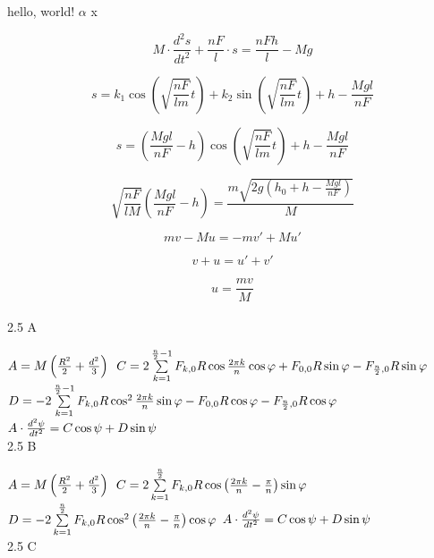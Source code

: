 \documentclass{article}
\begin{document}
hello, world!
$\alpha$
x

\begin{equation}
M\cdot\frac{d^{2}s}{dt^{2}}+\frac{nF}{l}\cdot s = \frac{nFh}{l}-Mg
\label{2}
\end{equation}

\begin{equation}
s=k_1\cos\left (  \sqrt{ \frac{nF}{lm}} t\right ) +k_2\sin\left ( \sqrt{\frac{nF}{lm}} t\right ) +h-\frac{Mgl}{nF}  
\end{equation}


\begin{equation}
s=\left ( \frac{Mgl}{nF}-h \right )\cos\left (  \sqrt{ \frac{nF}{lm}} t\right ) +h-\frac{Mgl}{nF}  
\end{equation}


\begin{equation}
\sqrt{\frac{nF}{lM}}\left ( \frac{Mgl}{nF}-h \right )=\frac{m\sqrt{2g\left ( h_0+h-\frac{Mgl}{nF} \right )}}{M}
\end{equation}

\begin{equation}
mv-Mu=-m{v}'+M{u}'
\end{equation}

\begin{equation}
v+u={u}'+{v}'
\end{equation}

\begin{equation}
u=\frac{mv}{M}
\end{equation}	
\\
2.5 A

$A=M\left ( \frac{R^2}{2}+\frac{d^2}{3} \right ) \\$
$C=2\sum\limits_{k=1}^{\frac{n}{2}-1}F_{k,0}R\cos\frac{2\pi k}{n}\cos\varphi 
	+ F_{0,0} R\sin\varphi
	- F_{\frac{n}{2},0} R\sin\varphi
 \\ $
$D=-2\sum\limits_{k=1}^{\frac{n}{2}-1}F_{k,0} R\cos^2\frac{2\pi k}{n}\sin\varphi
	-F_{0,0} R\cos\varphi
	-F_{\frac{n}{2},0} R\cos\varphi 
\\$
$A\cdot \frac{d^{2}\psi }{dt^{2} }=C\cos\psi+D\sin \psi
\\$
\\
2.5 B

$A=M\left ( \frac{R^2}{2}+\frac{d^2}{3} \right ) \\ $
$C= 2\sum\limits_{k=1}^{\frac{n}{2}}F_{k,0}R\cos\left ( \frac{2\pi k}{n}-\frac{\pi}{n} \right)\sin\varphi
\\ $
$D=-2\sum\limits_{k=1}^{\frac{n}{2}}F_{k,0} R\cos^2\left ( \frac{2\pi k}{n}-\frac{\pi}{n} \right )\cos\varphi
\\ $
$A\cdot \frac{d^{2}\psi }{dt^{2} }=C\cos\psi+D\sin \psi
\\$
\\
2.5 C
\end{document}
